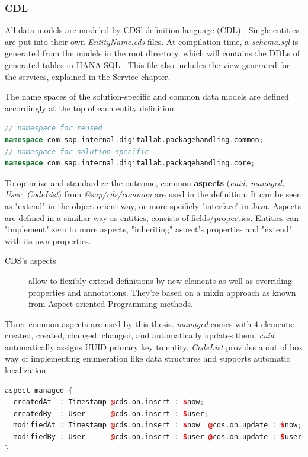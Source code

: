 \subsubsection{CDL}
All data models are modeled by CDS' definition language (CDL) \cite{cap-cds-cdl}. Single entities are put into their own \textit{EntityName.cds} files. 
At compilation time, a \textit{schema.sql} is generated from the models in the root directory, which will contains the DDLs of generated tables in HANA SQL \cite{hanasql}. This file also includes the view generated for the services, explained in the Service chapter.


The name spaces of the solution-specific and common data models are defined accordingly at the top of each entity definition.

\begin{lstlisting}[language={c++}]
// namespace for reused
namespace com.sap.internal.digitallab.packagehandling.common; 
// namespace for solution-specific
namespace com.sap.internal.digitallab.packagehandling.core; 
\end{lstlisting}


To optimize and standardize the outcome, common \textbf{aspects} (\textit{cuid, managed, User, CodeList}) from \textit{@sap/cds/common} are used in the definition. \cite{cap-cds-common-aspects} It can be seen as "extend" in the object-orient way, or more speificly "interface" in Java. Aspects are defined in a similiar way as entities, consists of fields/properties. Entities can "implement" zero to more aspects, "inheriting" aspect's properties and "extend" with its own properties. 

\begin{description}
    \item[CDS's aspects] allow to flexibly extend definitions by new elements as well as overriding properties and annotations. They're based on a mixin approach as known from Aspect-oriented Programming methods. \cite{cap-cds-common-aspects}
\end{description}

Three common aspects are used by this thesis. \textit{managed} comes with 4 elements: created, created, changed, changed, and automatically updates them. \textit{cuid} automatically assigns UUID primary key to entity. \textit{CodeList} provides a out of box way of implementing enumeration like data structures and supports automatic localization.

\begin{lstlisting}[language={c++}]
aspect managed {
  createdAt  : Timestamp @cds.on.insert : $now;
  createdBy  : User      @cds.on.insert : $user;
  modifiedAt : Timestamp @cds.on.insert : $now  @cds.on.update : $now;
  modifiedBy : User      @cds.on.insert : $user @cds.on.update : $user;
}
\end{lstlisting}

